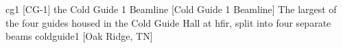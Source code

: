 \newglsXinstitution%
{cg1}%
[CG{\--}1]%
{the Cold Guide 1 Beamline}%
[Cold Guide 1 Beamline]%
{The largest of the four guides housed in the Cold Guide Hall at \gls{hfir}, split into four separate beams \cite{website:HFIR:CG1}}%
{coldguide1}%
[Oak Ridge, TN]%